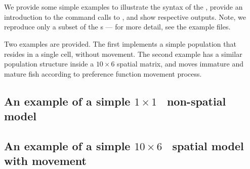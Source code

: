 
\section{\label{sec:examples}}

We provide some simple examples to illustrate the syntax of the \config, provide an introduction to the command calls to \SPM, and show respective outputs. Note, we reproduce only a subset of the \config s --- for more detail, see the example files. 

Two examples are provided. The first implements a simple population that resides in a single cell, without movement. The second example has a similar population structure inside a $10 \times 6$ spatial matrix, and moves immature and mature fish according to preference function movement process.

\subsection{An example of a simple
  \texorpdfstring{$ 1 \times 1 $}{%
    1 x 1
  }%
\ non-spatial model\label{example1}} 



\subsection{An example of a simple
  \texorpdfstring{$ 10 \times 6 $}{%
    10 x 6
  }%
\ spatial model with movement\label{example2}}



